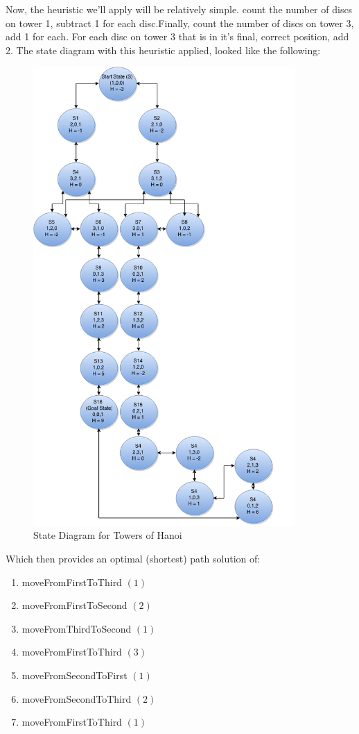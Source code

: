 \documentclass[11pt]{article}
\begin{document}
\begin{enumerate}
Now, the heuristic we'll apply will be relatively simple. count the number of discs on tower 1, subtract 1 for each disc.Finally, count the number of discs on tower 3, add 1 for each. For each disc on tower 3 that is in it's final, correct position, add 2.
The state diagram with this heuristic applied, looked like the following: 
\begin{figure}[ht!]
\centering
\includegraphics[width=100mm]{HanoiTower.png}
\caption{State Diagram for Towers of Hanoi \label{overflow}}
\end{figure}

Which then provides an optimal (shortest) path solution of: 
\begin{enumerate}[(1)]
\item moveFromFirstToThird $(1)$
\item moveFromFirstToSecond $(2)$
\item moveFromThirdToSecond $(1)$
\item moveFromFirstToThird $(3)$
\item moveFromSecondToFirst $(1)$
\item moveFromSecondToThird $(2)$
\item moveFromFirstToThird $(1)$
\end{enumerate}


\end{enumerate}
\end{document}
